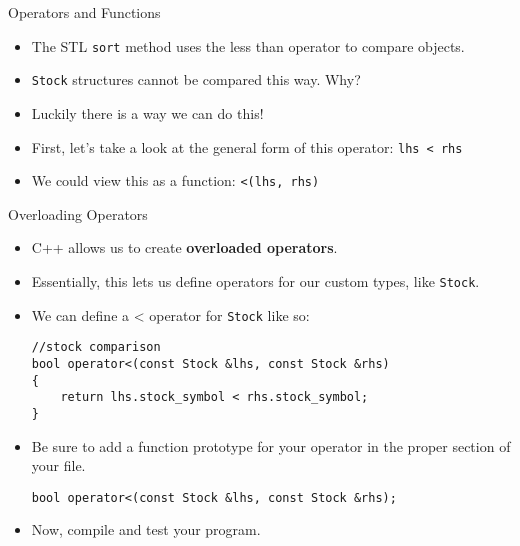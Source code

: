 \documentclass[]{beamer}
\begin{document}
\begin{frame}[fragile]{Operators and Functions}
    \begin{itemize}[<+->]
        \item The STL \texttt{sort} method uses the less than operator
            to compare objects.
        \item \texttt{Stock} structures cannot be compared this way.
            Why?
        \item Luckily there is a way we can do this!
        \item First, let's take a look at the general form of this
            operator:
            \newline\verb!lhs < rhs!
        \item We could view this as a function:
            \newline\verb!<(lhs, rhs)!
    \end{itemize}
\end{frame}

\begin{frame}[fragile]{Overloading Operators}
    \begin{itemize}[<+->]
        \item C++ allows us to create \textbf{overloaded operators}.
        \item Essentially, this lets us define operators for our
            custom types, like \texttt{Stock}.
        \item We can define a < operator for \texttt{Stock} like so:
        \begin{adjustbox}{max width=0.9\textwidth}
        \begin{BVerbatim}
//stock comparison
bool operator<(const Stock &lhs, const Stock &rhs)
{
    return lhs.stock_symbol < rhs.stock_symbol;
}
        \end{BVerbatim}
        \end{adjustbox}
        \item Be sure to add a function prototype for your operator in
            the proper section of your file.
        \begin{adjustbox}{max width=0.9\textwidth}
        \begin{BVerbatim}
bool operator<(const Stock &lhs, const Stock &rhs);
        \end{BVerbatim}
        \end{adjustbox}
        \item Now, compile and test your program.
    \end{itemize}
\end{frame}
\end{document}
